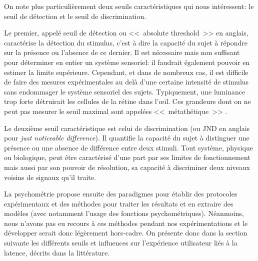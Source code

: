 	\par On note plus particulièrement deux seuils caractéristiques qui nous intéressent: le seuil de détection et le seuil de discrimination. 
	
	\par Le premier, appelé seuil de détection ou <<~absolute threshold~>> en anglais, caractérise la détection du stimulus, c'est à dire la capacité du sujet à répondre sur la présence ou l'absence de ce dernier. Il est nécessaire mais non suffisant pour déterminer en entier un système sensoriel: il faudrait également pouvoir en estimer la limite supérieure. Cependant, et dans de nombreux cas, il est difficile de faire des mesures expérimentales au delà d'une certaine intensité de stimulus sans endommager le système sensoriel des sujets. Typiquement, une luminance trop forte détruirait les cellules de la rétine dans l'œil. Ces grandeurs dont on ne peut pas mesurer le seuil maximal sont appelées <<~métathétique~>> \citep{stevens_psychophysical_1957}.
	
	\par Le deuxième seuil caractéristique est celui de discrimination (ou JND en anglais pour \textit{just noticeable difference}). Il quantifie la capacité du sujet à distinguer une présence ou une absence de différence entre deux stimuli. Tout système, physique ou biologique, peut être caractérisé d'une part par ses limites de fonctionnement mais aussi par son pouvoir de résolution, sa capacité à discriminer deux niveaux voisins de signaux qu'il traite.
	
	\par La psychométrie propose ensuite des paradigmes pour établir des protocoles expérimentaux et des méthodes pour traiter les résultats et en extraire des modèles (avec notamment l'usage des fonctions psychométriques). Néanmoins, nous n'avons pas eu recours à ces méthodes pendant nos expérimentations et le développer serait donc légèrement hors-cadre. On présente donc dans la section suivante les différents seuils et influences sur l'expérience utilisateur liés à la latence, décrits dans la littérature.
	
